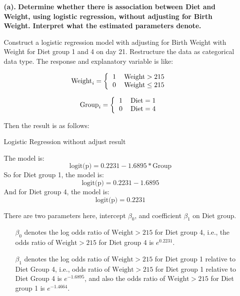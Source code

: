 \documentclass[10pt,letterpaper]{article}
\begin{document}
\begin{enumerate}[leftmargin=0cm,itemindent=.5cm,labelwidth=\itemindent,labelsep=0cm,align=left]
\item[\textbf{(a).} ] \textbf{Determine whether there is association between Diet and Weight, using logistic regression, without adjusting for Birth Weight. Interpret what the estimated parameters denote.}

Construct a logistic regression model with adjusting for Birth Weight with Weight for Diet group 1 and 4 on day 21. Restructure the data as categorical data type. The response and explanatory variable is like:\\
\begin{multicols}{2}
\[\text{Weight}_i=  
\left \{
  \begin{tabular}{cc}
  1 &  $\text{Weight}>215$\\
  0 &  $\text{Weight} \leq 215$\\
  \end{tabular}
\right.
\]

\[\text{Group}_i=  
\left \{
  \begin{tabular}{cc}
  1 &  $\text{Diet}=1$\\
  0 &  $\text{Diet}=4 $ \\
  \end{tabular}
\right.
\]
\end{multicols}
Then the result is as follows:
\begin{center}
Logistic Regression without adjust result

\end{center}
The model is:
\[\text{logit(p)} =0.2231-1.6895*\text{Group} \]
So for Diet group 1, the model is:
\[\text{logit(p)} = 0.2231-1.6895\]
And for Diet group 4, the model is:
\[\text{logit(p)} = 0.2231\]

There are two parameters here, intercept $\beta_0$, and coefficient $\beta_1$ on Diet group.
\begin{enumerate}[leftmargin=0cm,itemindent=.5cm,labelwidth=\itemindent,labelsep=0cm,align=left]
\item[\textbullet] $\beta_0$ denotes the log odds ratio of $\text{Weight}>215$ for Diet group 4, i.e., the odds ratio of $\text{Weight}>215$  for Diet group 4 is $e^{0.2231}$.
\item[\textbullet] $\beta_1$ denotes the log odds ratio of $\text{Weight}>215$ for Diet group 1 relative to Diet Group 4, i.e., odds ratio of $\text{Weight}>215$  for Diet group 1 relative to Diet Group 4 is $e^{-1.6895}$,
and also the odds ratio of $\text{Weight}>215$ for Diet group 1 is $e^{-1.4664}$.\\


\end{enumerate}
\end{enumerate}
\end{document}
